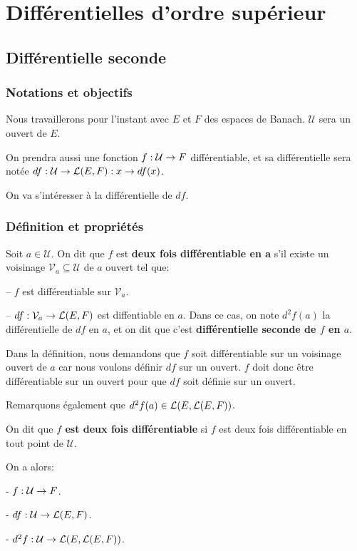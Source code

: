 \chapter{Différentielles d'ordre supérieur}

\section{Différentielle seconde}

\subsection*{Notations et objectifs}
Nous travaillerons pour l'instant avec $E$ et $F$ des espaces de Banach.
$\mathcal{U}$ sera un ouvert de $E$.

On prendra aussi une fonction $f : \mathcal{U} \rightarrow F$ différentiable, et
sa différentielle sera notée
$df : \mathcal{U} \rightarrow \mathcal{L}(E, F) : x \rightarrow df(x)$.

On va s'intéresser à la différentielle de $df$.

\subsection{Définition et propriétés}

\begin{definition}
	Soit $a \in \mathcal{U}$. On dit que $f$ est \textbf{deux fois
	différentiable en a} s'il existe un voisinage $\mathcal{V}_{a} \subseteq
	\mathcal{U}$ de $a$ ouvert tel que:

	-- $f$ est différentiable sur $\mathcal{V}_{a}$.

	-- $df : \mathcal{V}_{a} \rightarrow \mathcal{L}(E, F)$ est diffentiable
	en $a$.
	Dans ce cas, on note $d^{2}f(a)$ la différentielle de $df$ en $a$, et on dit
	que c'est \textbf{différentielle seconde de $f$ en $a$}.
\end{definition}

Dans la définition, nous demandons que $f$ soit différentiable sur un
voisinage ouvert de $a$ car nous voulons définir $df$ sur un ouvert. $f$ doit
donc être différentiable sur un ouvert pour que $df$ soit définie sur un ouvert.

Remarquons également que $d^{2}f(a) \in
\mathcal{L}(E, \mathcal{L}(E, F))$.

\begin{definition}
	On dit que \textbf{$f$ est deux fois différentiable} si $f$ est deux fois
	différentiable en tout point de $\mathcal{U}$.

	On a alors:

	- $f : \mathcal{U} \rightarrow F$.

	- $df : \mathcal{U} \rightarrow \mathcal{L}(E, F)$.

	- $d^{2}f : \mathcal{U} \rightarrow \mathcal{L}(E, \mathcal{L}(E, F))$.
\end{definition}

